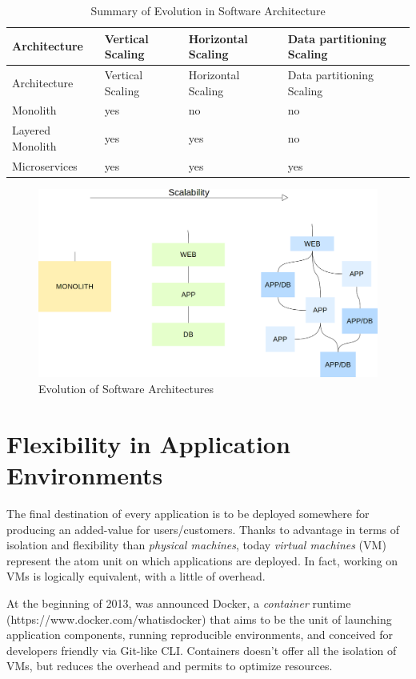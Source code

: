 \begin{longtable}[c]{@{}llll@{}}
\caption{Summary of Evolution in Software Architecture}\tabularnewline
\toprule
Architecture & Vertical Scaling & Horizontal Scaling & Data partitioning
Scaling\tabularnewline
\midrule
\endfirsthead
\toprule
Architecture & Vertical Scaling & Horizontal Scaling & Data partitioning
Scaling\tabularnewline
\midrule
\endhead
Monolith & yes & no & no\tabularnewline
Layered Monolith & yes & yes & no\tabularnewline
Microservices & yes & yes & yes\tabularnewline
\bottomrule
\end{longtable}

\begin{figure}[htbp]
\centering
\includegraphics{media/ch2-microservices.png}
\caption{Evolution of Software Architectures}
\end{figure}

\section{Flexibility in Application
Environments}\label{flexibility-in-application-environments}

The final destination of every application is to be deployed somewhere
for producing an added-value for users/customers. Thanks to advantage in
terms of isolation and flexibility than \textit{physical machines}, today
\textit{virtual machines} (VM) represent the atom unit on which
applications are deployed. In fact, working on VMs is logically
equivalent, with a little of overhead.

At the beginning of 2013, was announced Docker, a \textit{container}
runtime (https://www.docker.com/whatisdocker) that aims to be the unit
of launching application components, running reproducible environments,
and conceived for developers friendly via Git-like CLI. Containers
doesn't offer all the isolation of VMs, but reduces the overhead and
permits to optimize resources.

